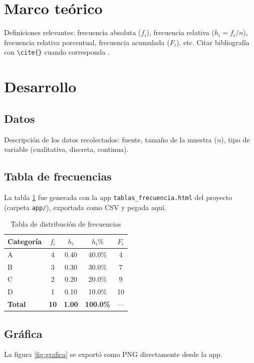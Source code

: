 \documentclass[11pt,letterpaper]{article}
\begin{document}
\section{Marco teórico}
Definiciones relevantes: frecuencia absoluta ($f_i$), frecuencia relativa ($h_i = f_i/n$),
frecuencia relativa porcentual, frecuencia acumulada ($F_i$), etc. Citar bibliografía
con \verb|\cite{}| cuando corresponda \cite{ejemplo2024}.

\section{Desarrollo}

\subsection{Datos}
Descripción de los datos recolectados: fuente, tamaño de la muestra ($n$), tipo de
variable (cualitativa, discreta, continua).

\subsection{Tabla de frecuencias}
La tabla \ref{tab:frecuencias} fue generada con la app \texttt{tablas\_frecuencia.html}
del proyecto (carpeta \texttt{app/}), exportada como CSV y pegada aquí.

\begin{table}[H]
    \centering
    \caption{Tabla de distribución de frecuencias}
    \label{tab:frecuencias}
    \begin{tabular}{lcccc}
        \toprule
        \textbf{Categoría} & \textbf{$f_i$} & \textbf{$h_i$} & \textbf{$h_i\%$} & \textbf{$F_i$} \\
        \midrule
        A & 4 & 0.40 & 40.0\% & 4 \\
        B & 3 & 0.30 & 30.0\% & 7 \\
        C & 2 & 0.20 & 20.0\% & 9 \\
        D & 1 & 0.10 & 10.0\% & 10 \\
        \midrule
        \textbf{Total} & \textbf{10} & \textbf{1.00} & \textbf{100.0\%} & --- \\
        \bottomrule
    \end{tabular}
\end{table}

\subsection{Gráfica}
La figura \ref{fig:grafica} se exportó como PNG directamente desde la app.
\end{document}
